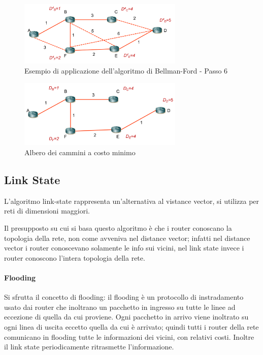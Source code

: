 \begin{figure}[h!]
    \centering
    \includegraphics[width=0.7\textwidth]{images/bf5.png}
    \caption{Esempio di applicazione dell'algoritmo di Bellman-Ford - Passo 6}
    \label{fig:bf6}
\end{figure}

\begin{figure}[h!]
    \centering
    \includegraphics[width=0.7\textwidth]{images/bf7.png}
    \caption{Albero dei cammini a costo minimo}
    \label{fig:bf7}
\end{figure}

\subsection{Link State}

L'algoritmo link-state rappresenta un'alternativa al vistance vector, si utilizza per reti di dimensioni maggiori.

Il presupposto su cui si basa questo algoritmo è che i router conoscano la topologia della rete, non come avveniva nel distance vector; infatti nel distance vector i router conoscevano solamente le info sui vicini, nel link state invece i router conoscono l'intera topologia della rete.

\paragraph{Flooding}
Si sfrutta il concetto di flooding: il flooding è un protocollo di instradamento usato dai router che inoltrano un pacchetto in ingresso su tutte le linee ad eccezione di quella da cui proviene. Ogni pacchetto in arrivo viene inoltrato su ogni linea di uscita eccetto quella da cui è arrivato;
quindi tutti i router della rete comunicano in flooding tutte le informazioni dei vicini, con relativi costi. Inoltre il link state periodicamente ritrasmette l'informazione.

